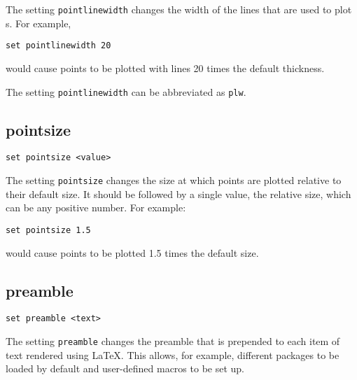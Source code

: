 The setting {\tt pointlinewidth} changes the width of the lines that are used to
plot \datapoint s.  For example,

\begin{verbatim}
set pointlinewidth 20
\end{verbatim}

\noindent would cause points to be plotted with lines 20 times the default thickness.

The setting {\tt pointlinewidth} can be abbreviated as {\tt plw}.


\subsection{pointsize}

\begin{verbatim}
set pointsize <value>
\end{verbatim}

The setting {\tt pointsize} changes the size at which points are plotted
relative to their default size. It should be followed by a single value, the
relative size, which can be any positive number. For example:

\begin{verbatim}
set pointsize 1.5
\end{verbatim}

\noindent would cause points to be plotted 1.5 times the default size.


\subsection{preamble}

\begin{verbatim}
set preamble <text>
\end{verbatim}

The setting {\tt preamble} changes the preamble that is prepended to each item of
text rendered using \LaTeX{}.  This allows, for example, different packages to
be loaded by default and user-defined macros to be set up.


%
%


